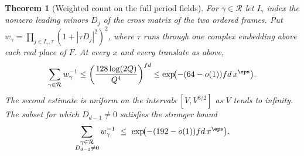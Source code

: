 \documentclass[a4paper,11pt]{article}
\newtheorem{theorem}[proposition]{Theorem}
\theoremstyle{definition}
\theoremstyle{remark}
\numberwithin{equation}{section}
\begin{document}
\begin{theorem}[Weighted count on the full period fields]
\label{thm:orbits204}
For \(\gamma\in\mathcal R\) let \(I_\gamma\) index the nonzero
leading minors \(D_j\) of the cross matrix of the two ordered frames.
Put \(w_\gamma=\prod_{j\in I_\gamma,\tau}(1+|\tau D_j|^2)^2\),
where \(\tau\) runs through one complex embedding above each real
place of \(F\). At every \(x\) and every translate as above,
\begin{equation}
  \sum_{\gamma\in\mathcal R} w_\gamma^{-1}
   \le \left(\frac{128\log(2Q)}{Q^4}\right)^{fd}
   \le \exp\!\bigl(-(64-o(1))fd\, x^\eps\bigr).
   \label{eq:orbits204}
\end{equation}
The second estimate is uniform on the intervals \([V,V^{3/2}]\)
as \(V\) tends to infinity. The subset for which \(D_{d-1}\ne0\)
satisfies the stronger bound
\[
   \sum_{\substack{\gamma\in\mathcal R\\D_{d-1}\ne0}}
       w_\gamma^{-1}\ \le\
       \exp\!\bigl(-(192-o(1))fd\,x^\eps\bigr).
\]
\end{theorem}
\end{document}

